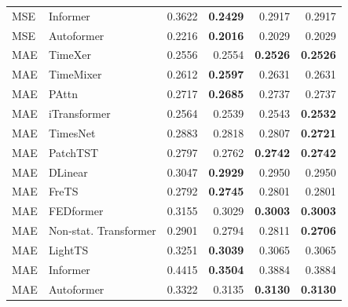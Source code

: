 \begin{longtable}{llrrrr}
MSE & Informer & 0.3622 & \textbf{0.2429} & 0.2917 & 0.2917 \\
MSE & Autoformer & 0.2216 & \textbf{0.2016} & 0.2029 & 0.2029 \\
\midrule
MAE & TimeXer & 0.2556 & 0.2554 & \textbf{0.2526} & \textbf{0.2526} \\
MAE & TimeMixer & 0.2612 & \textbf{0.2597} & 0.2631 & 0.2631 \\
MAE & PAttn & 0.2717 & \textbf{0.2685} & 0.2737 & 0.2737 \\
MAE & iTransformer & 0.2564 & 0.2539 & 0.2543 & \textbf{0.2532} \\
MAE & TimesNet & 0.2883 & 0.2818 & 0.2807 & \textbf{0.2721} \\
MAE & PatchTST & 0.2797 & 0.2762 & \textbf{0.2742} & \textbf{0.2742} \\
MAE & DLinear & 0.3047 & \textbf{0.2929} & 0.2950 & 0.2950 \\
MAE & FreTS & 0.2792 & \textbf{0.2745} & 0.2801 & 0.2801 \\
MAE & FEDformer & 0.3155 & 0.3029 & \textbf{0.3003} & \textbf{0.3003} \\
MAE & Non-stat. Transformer & 0.2901 & 0.2794 & 0.2811 & \textbf{0.2706} \\
MAE & LightTS & 0.3251 & \textbf{0.3039} & 0.3065 & 0.3065 \\
MAE & Informer & 0.4415 & \textbf{0.3504} & 0.3884 & 0.3884 \\
MAE & Autoformer & 0.3322 & 0.3135 & \textbf{0.3130} & \textbf{0.3130} \\
\end{longtable}
\endgroup

